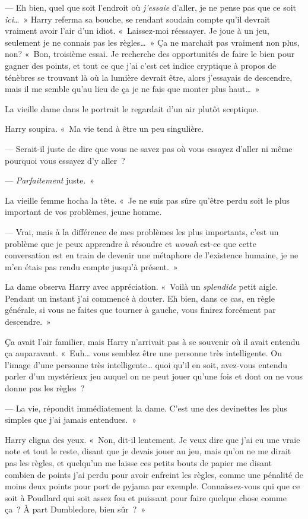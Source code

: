 --- Eh bien, quel que soit l'endroit où \emph{j'essaie} d'aller, je ne pense pas que ce soit \emph{ici}…~» Harry referma sa bouche, se rendant soudain compte qu'il devrait vraiment avoir l'air d'un idiot.
«~Laissez-moi réessayer. Je joue à un jeu, seulement je ne connais pas les règles…~»
Ça ne marchait pas vraiment non plus, non?
«~Bon, troisième essai.
Je recherche des opportunités de faire le bien pour gagner des points, et tout ce que j'ai c'est cet indice cryptique à propos de ténèbres se trouvant là où la lumière devrait être, alors j'essayais de descendre, mais il me semble qu'au lieu de ça je ne fais que monter plus haut…~»

La vieille dame dans le portrait le regardait d'un air plutôt sceptique.

Harry soupira.
«~Ma vie tend à être un peu singulière.

--- Serait-il juste de dire que vous ne savez pas où vous essayez d'aller ni même pourquoi vous essayez d'y aller~?

--- \emph{Parfaitement} juste.~»

La vieille femme hocha la tête.
«~Je ne suis pas sûre qu'être perdu soit le plus important de vos problèmes, jeune homme.

--- Vrai, mais à la différence de mes problèmes les plus importants, c'est un problème que je peux apprendre à résoudre et \emph{wouah} est-ce que cette conversation est en train de devenir une métaphore de l'existence humaine, je ne m'en étais pas rendu compte jusqu'à présent.~»

La dame observa Harry avec appréciation. «~Voilà un \emph{splendide} petit aigle. Pendant un instant j'ai commencé à douter. Eh bien, dans ce cas, en règle générale, si vous ne faites que tourner à gauche, vous finirez forcément par descendre.~»

Ça avait l'air familier, mais Harry n'arrivait pas à se souvenir où il avait entendu ça auparavant. «~Euh… vous semblez être une personne très intelligente.
Ou l'image d'une personne très intelligente… quoi qu'il en soit, avez-vous entendu parler d'un mystérieux jeu auquel on ne peut jouer qu'une fois et dont on ne vous donne pas les règles~?

--- La vie, répondit immédiatement la dame.
C'est une des devinettes les plus simples que j'ai jamais entendues.~»

Harry cligna des yeux. «~Non, dit-il lentement. Je veux dire que j'ai eu une vraie note et tout le reste, disant que je devais jouer au jeu, mais qu'on ne me dirait pas les règles, et quelqu'un me laisse ces petits bouts de papier me disant combien de points j'ai perdu pour avoir enfreint les règles, comme une pénalité de moins deux points pour port de pyjama par exemple.
Connaissez-vous qui que ce soit à Poudlard qui soit assez fou et puissant pour faire quelque chose comme ça~?
À part Dumbledore, bien sûr~?~»

